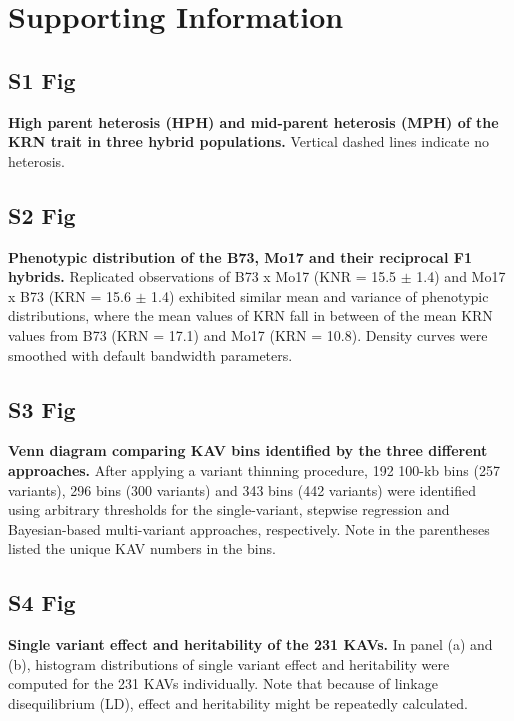 \documentclass[10pt,letterpaper]{article}
\begin{document}
\section*{Supporting Information}


\subsection*{S1 Fig}
\label{Fig_S1}
{\bf High parent heterosis (HPH) and mid-parent heterosis (MPH) of the KRN trait in three hybrid populations.} Vertical dashed lines indicate no heterosis.

\subsection*{S2 Fig}
\label{Fig_S2}
{\bf Phenotypic distribution of the B73, Mo17 and their reciprocal F1 hybrids.} Replicated observations of B73 x Mo17 (KNR = 15.5 $\pm$ 1.4) and Mo17 x B73 (KRN = 15.6 $\pm$ 1.4) exhibited similar mean and variance of phenotypic distributions, where the mean values of KRN fall in between of the mean KRN values from B73 (KRN = 17.1) and Mo17 (KRN = 10.8). Density curves were smoothed with default bandwidth parameters.

\subsection*{S3 Fig}
\label{Fig_S3}
{\bf Venn diagram comparing KAV bins identified by the three different approaches.} After applying a variant thinning procedure, 192 100-kb bins (257 variants), 296 bins (300 variants) and 343 bins (442 variants) were identified using arbitrary thresholds for the single-variant, stepwise regression and Bayesian-based multi-variant approaches, respectively. Note in the parentheses listed the unique KAV numbers in the bins.

\subsection*{S4 Fig}
\label{Fig_S4}
{\bf Single variant effect and heritability of the 231 KAVs.} In panel (a) and (b), histogram distributions of single variant effect and heritability were computed for the 231 KAVs individually. Note that because of linkage disequilibrium (LD), effect and heritability might be repeatedly calculated.
\end{document}
